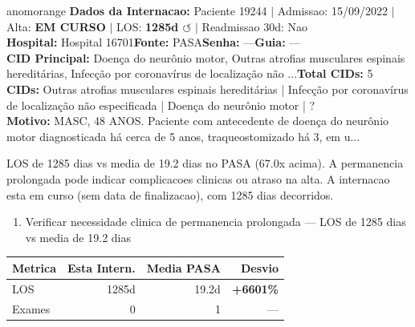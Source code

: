 \documentclass[a4paper,10pt]{article}
\begin{document}
\newpage

\begin{anomalycard}[Internacao 77305 | PASA | ALTO (z=4.11)]{anomorange}
\textbf{Dados da Internacao:} Paciente 19244 $\mid$ Admissao: 15/09/2022 $\mid$ Alta: \textcolor{anomorange}{\textbf{EM CURSO}} $\mid$ LOS: \textbf{1285d \textcolor{anomorange}{$\circlearrowleft$}} $\mid$ Readmissao 30d: Nao\\
\textbf{Hospital:} Hospital 16701\quad\textbf{Fonte:} PASA\quad\textbf{Senha:} ---\quad\textbf{Guia:} ---\\
\textbf{CID Principal:} {\small Doença do neurônio motor, Outras atrofias musculares espinais hereditárias, Infecção por coronavírus de localização não ...}\quad\textbf{Total CIDs:} 5\\

\textbf{CIDs:} {\scriptsize Outras atrofias musculares espinais hereditárias | Infecção por coronavírus de localização não especificada | Doença do neurônio motor | ?}\\

\textbf{Motivo:} {\scriptsize MASC, 48 ANOS. Paciente com antecedente de doença do neurônio motor diagnosticada há cerca de 5 anos, traqueostomizado há 3, em u...}\\

\vspace{2pt}\begin{tcolorbox}[colback=severityred!20,colframe=anomorange,title={\textbf{Interpretacao de Negocio}},fonttitle=\bfseries\small,left=4pt,right=4pt,top=3pt,bottom=3pt]
{\small LOS de 1285 dias vs media de 19.2 dias no PASA (67.0x acima). A permanencia prolongada pode indicar complicacoes clinicas ou atraso na alta. A internacao esta em curso (sem data de finalizacao), com 1285 dias decorridos.}
\end{tcolorbox}
\begin{tcolorbox}[colback=severityyellow!30,colframe=anomorange,title={\textbf{Recomendacoes Especificas}},fonttitle=\bfseries\small,left=4pt,right=4pt,top=3pt,bottom=3pt]
\begin{enumerate}[nosep,leftmargin=16pt]
\item {\small Verificar necessidade clinica de permanencia prolongada --- LOS de 1285 dias vs media de 19.2 dias}
\end{enumerate}
\end{tcolorbox}
\begin{center}\begin{tabular}{l r r r}\toprule\textbf{Metrica} & \textbf{Esta Intern.} & \textbf{Media PASA} & \textbf{Desvio} \\\midrule
LOS & 1285d & 19.2d & \textcolor{anomred}{\textbf{+6601\%}} \\
Exames & 0 & 1 & --- \\
\bottomrule\end{tabular}\end{center}


\end{anomalycard}
\end{document}
